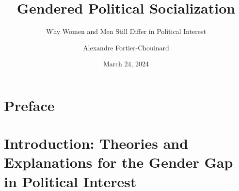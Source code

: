 \documentclass[
  letterpaper,
  DIV=11,
  numbers=noendperiod]{scrreprt}
\title{Gendered Political Socialization}
\subtitle{Why Women and Men Still Differ in Political Interest}
\author{Alexandre Fortier-Chouinard}
\date{March 24, 2024}
\renewcommand*\contentsname{Table of contents}
\newcommand\contentsname{Table of contents}
\begin{document}
\maketitle

\renewcommand*\contentsname{Table of contents}
{
\hypersetup{linkcolor=}
\setcounter{tocdepth}{2}
\tableofcontents
}

\chapter*{Preface}\label{preface}



\chapter{Introduction: Theories and Explanations for the Gender Gap in
Political Interest}\label{sec-chap1}
\end{document}
